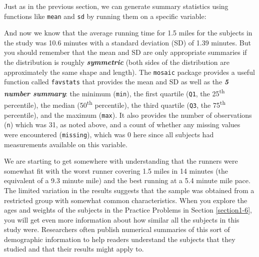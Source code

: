 \documentclass[
]{book}
\newenvironment{Shaded}{\begin{snugshade}}{\end{snugshade}}
\newcommand{\DecValTok}[1]{\textcolor[rgb]{0.00,0.00,0.81}{#1}}
\newcommand{\FloatTok}[1]{\textcolor[rgb]{0.00,0.00,0.81}{#1}}
\newcommand{\FunctionTok}[1]{\textcolor[rgb]{0.00,0.00,0.00}{#1}}
\newcommand{\NormalTok}[1]{#1}
\newcommand{\SpecialCharTok}[1]{\textcolor[rgb]{0.00,0.00,0.00}{#1}}
\begin{document}
\indent Just as in the previous section, we can generate summary statistics using functions like \texttt{mean} and \texttt{sd} by running them on a specific variable:

\begin{Shaded}
\end{Shaded}

And now we know that the average running time for 1.5 miles for the subjects in the study was 10.6 minutes with a standard deviation (SD) of 1.39 minutes. But you should remember that the
mean and SD are only appropriate summaries if the distribution is roughly
\textbf{\emph{symmetric}} (both sides of the distribution are approximately the same shape and length). The
\texttt{mosaic} package provides a useful function called \texttt{favstats} that provides
the mean and SD as well as the \textbf{\emph{5 number summary}}: 
the minimum (\texttt{min}), the first quartile (\texttt{Q1}, the 25\textsuperscript{th} percentile),
the median (50\textsuperscript{th} percentile), the third quartile (\texttt{Q3}, the 75\textsuperscript{th}
percentile), and the maximum (\texttt{max}). It also provides the number of
observations (\texttt{n}) which was 31, as noted above, and a count of whether any
missing values were encountered (\texttt{missing}), which was 0 here since all
subjects had measurements available on this variable.

\begin{Shaded}
\end{Shaded}

\indent We are starting to get somewhere with understanding that the runners were
somewhat fit with the worst runner covering 1.5 miles in 14 minutes
(the equivalent of a 9.3 minute mile)
and the best running at a 5.4 minute mile pace. The limited variation in the
results suggests that the sample was obtained from a restricted group with
somewhat common characteristics. When you explore the ages and weights of the
subjects in the Practice Problems in Section \ref{section1-6}, you will get even more
information about how similar all the subjects in this study were. Researchers often publish numerical summaries of this sort of demographic information to help readers understand the subjects that they studied and that their results might apply to.
\end{document}
